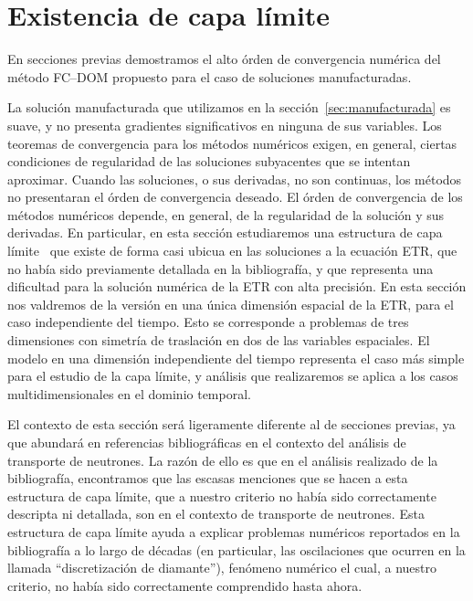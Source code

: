 \section{Existencia de capa límite}
\label{sec:blayer}
En secciones previas demostramos el alto órden de convergencia numérica 
del método FC--DOM propuesto para el caso de soluciones manufacturadas.

La solución manufacturada que utilizamos en la sección~\ref{sec:manufacturada}
es suave, y no presenta gradientes significativos en ninguna de sus variables. 
Los teoremas de convergencia para los métodos numéricos exigen, en general,  
ciertas condiciones de regularidad de las soluciones subyacentes que se intentan aproximar. Cuando las soluciones, 
o sus derivadas, no son continuas, los métodos no presentaran el órden 
de convergencia deseado. El órden de convergencia de los métodos numéricos 
depende, en general, de la regularidad de la solución y sus derivadas. En particular, en esta sección estudiaremos 
una estructura de capa límite~\cite{Gaggioli2021} que existe de forma casi ubicua en las soluciones 
a la ecuación ETR, que no había sido previamente detallada en la bibliografía, 
y que representa una dificultad para la solución numérica de la ETR con alta precisión.
En esta sección nos valdremos de la versión en una única dimensión espacial de la ETR, 
para el caso independiente del tiempo. 
Esto se corresponde a problemas de tres dimensiones con simetría de traslación en dos 
de las variables espaciales. El modelo en una dimensión independiente del tiempo representa el caso 
más simple para el estudio de la capa límite, y análisis que realizaremos
se aplica a los casos multidimensionales en el dominio temporal. 

El contexto de esta sección será ligeramente diferente al de secciones previas, 
ya que abundará en referencias bibliográficas en el contexto 
del análisis de transporte de neutrones. La razón de ello 
es que en el análisis realizado de la bibliografía, encontramos 
que las escasas menciones que se hacen a esta estructura de capa límite, 
que a nuestro criterio no había sido correctamente descripta ni detallada, 
son en el contexto de transporte de neutrones. Esta estructura 
de capa límite ayuda a explicar problemas numéricos reportados en la bibliografía 
a lo largo de décadas
(en particular, las oscilaciones que ocurren en la llamada 
``discretización de diamante''), fenómeno numérico el cual, a nuestro 
criterio, no había sido correctamente comprendido hasta ahora.

